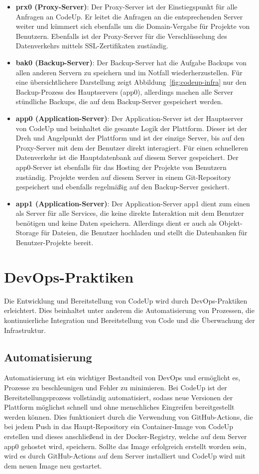 \documentclass[main.tex]{subfiles}
\begin{document}
    \begin{itemize}
        \item \textbf{prx0 (Proxy-Server)}: Der Proxy-Server ist der Einstiegspunkt für alle Anfragen an CodeUp.
        Er leitet die Anfragen an die entsprechenden Server weiter und kümmert sich ebenfalls um die Domain-Vergabe für Projekte von Benutzern.
        Ebenfalls ist der Proxy-Server für die Verschlüsselung des Datenverkehrs mittels SSL-Zertifikaten zuständig.
        \item \textbf{bak0 (Backup-Server)}: Der Backup-Server hat die Aufgabe Backups von allen anderen Servern zu speichern und im Notfall wiederherzustellen.
        Für eine übersichtlichere Darstellung zeigt Abbildung~\ref{fig:codeup-infra} nur den Backup-Prozess des Hauptservers (app0), allerdings machen alle Server stündliche Backups, die auf dem Backup-Server gespeichert werden.
        \item \textbf{app0 (Application-Server)}: Der Application-Server ist der Hauptserver von CodeUp und beinhaltet die gesamte Logik der Plattform.
        Dieser ist der Dreh und Angelpunkt der Plattform und ist der einzige Server, bis auf den Proxy-Server mit dem der Benutzer direkt interagiert.
        Für einen schnelleren Datenverkehr ist die Hauptdatenbank auf diesem Server gespeichert.
        Der app0-Server ist ebenfalls für das Hosting der Projekte von Benutzern zuständig.
        Projekte werden auf diesem Server in einem Git-Repository gespeichert und ebenfalls regelmäßig auf den Backup-Server gesichert.
        \item \textbf{app1 (Application-Server)}: Der Application-Server app1 dient zum einen als Server für alle Services, die keine direkte Interaktion mit dem Benutzer benötigen und keine Daten speichern.
        Allerdings dient er auch als Objekt-Storage für Dateien, die Benutzer hochladen und stellt die Datenbanken für Benutzer-Projekte bereit.
    \end{itemize}
    \section{DevOps-Praktiken}
    Die Entwicklung und Bereitstellung von CodeUp wird durch DevOps-Praktiken erleichtert.
    Dies beinhaltet unter anderem die Automatisierung von Prozessen, die kontinuierliche Integration und Bereitstellung von Code und die Überwachung der Infrastruktur.
    \subsection{Automatisierung}
    Automatisierung ist ein wichtiger Bestandteil von DevOps und ermöglicht es, Prozesse zu beschleunigen und Fehler zu minimieren.
    Bei CodeUp ist der Bereitstellungsprozess vollständig automatisiert, sodass neue Versionen der Plattform möglichst schnell und ohne menschliches Eingreifen bereitgestellt werden können.
    Dies funktioniert durch die Verwendung von GitHub-Actions, die bei jedem Push in das Haupt-Repository ein Container-Image von CodeUp erstellen und dieses anschließend in der Docker-Registry, welche auf dem Server app0 gehostet wird, speichern.
    Sollte das Image erfolgreich erstellt worden sein, wird es durch GitHub-Actions auf dem Server installiert und CodeUp wird mit dem neuen Image neu gestartet.
\end{document}
